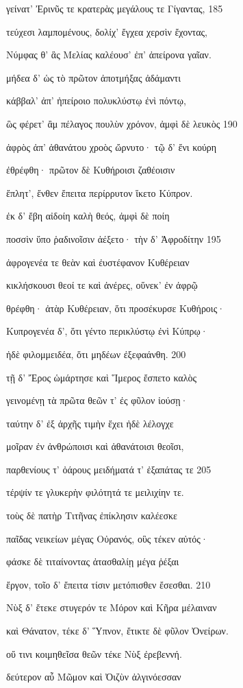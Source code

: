 γείνατ' Ἐρινῦς τε κρατερὰς μεγάλους τε Γίγαντας, 185

τεύχεσι λαμπομένους, δολίχ' ἔγχεα χερσὶν ἔχοντας,

Νύμφας θ' ἃς Μελίας καλέουσ' ἐπ' ἀπείρονα γαῖαν. 

μήδεα δ' ὡς τὸ πρῶτον ἀποτμήξας ἀδάμαντι

κάββαλ' ἀπ' ἠπείροιο πολυκλύστῳ ἐνὶ πόντῳ,

ὣς φέρετ' ἂμ πέλαγος πουλὺν χρόνον, ἀμφὶ δὲ λευκὸς 190

ἀφρὸς ἀπ' ἀθανάτου χροὸς ὤρνυτο· τῷ δ' ἔνι κούρη 

ἐθρέφθη· πρῶτον δὲ Κυθήροισι ζαθέοισιν 

ἔπλητ', ἔνθεν ἔπειτα περίρρυτον ἵκετο Κύπρον.

ἐκ δ' ἔβη αἰδοίη καλὴ θεός, ἀμφὶ δὲ ποίη

ποσσὶν ὕπο ῥαδινοῖσιν ἀέξετο· τὴν δ' Ἀφροδίτην 195 

ἀφρογενέα τε θεὰν καὶ ἐυστέφανον Κυθέρειαν

κικλήσκουσι θεοί τε καὶ ἀνέρες, οὕνεκ' ἐν ἀφρῷ

θρέφθη· ἀτὰρ Κυθέρειαν, ὅτι προσέκυρσε Κυθήροις· 

Κυπρογενέα δ', ὅτι γέντο περικλύστῳ ἐνὶ Κύπρῳ·

ἠδὲ φιλομμειδέα, ὅτι μηδέων ἐξεφαάνθη. 200

τῇ δ' Ἔρος ὡμάρτησε καὶ Ἵμερος ἔσπετο καλὸς

γεινομένῃ τὰ πρῶτα θεῶν τ' ἐς φῦλον ἰούσῃ· 

ταύτην δ' ἐξ ἀρχῆς τιμὴν ἔχει ἠδὲ λέλογχε

μοῖραν ἐν ἀνθρώποισι καὶ ἀθανάτοισι θεοῖσι,

παρθενίους τ' ὀάρους μειδήματά τ' ἐξαπάτας τε 205

τέρψίν τε γλυκερὴν φιλότητά τε μειλιχίην τε.

τοὺς δὲ πατὴρ Τιτῆνας ἐπίκλησιν καλέεσκε

παῖδας νεικείων μέγας Οὐρανός, οὓς τέκεν αὐτός· 

φάσκε δὲ τιταίνοντας ἀτασθαλίῃ μέγα ῥέξαι

ἔργον, τοῖο δ' ἔπειτα τίσιν μετόπισθεν ἔσεσθαι. 210

Νὺξ δ' ἔτεκε στυγερόν τε Μόρον καὶ Κῆρα μέλαιναν 

καὶ Θάνατον, τέκε δ' Ὕπνον, ἔτικτε δὲ φῦλον Ὀνείρων. 

οὔ τινι κοιμηθεῖσα θεῶν τέκε Νὺξ ἐρεβεννή. 

δεύτερον αὖ Μῶμον καὶ Ὀιζὺν ἀλγινόεσσαν

